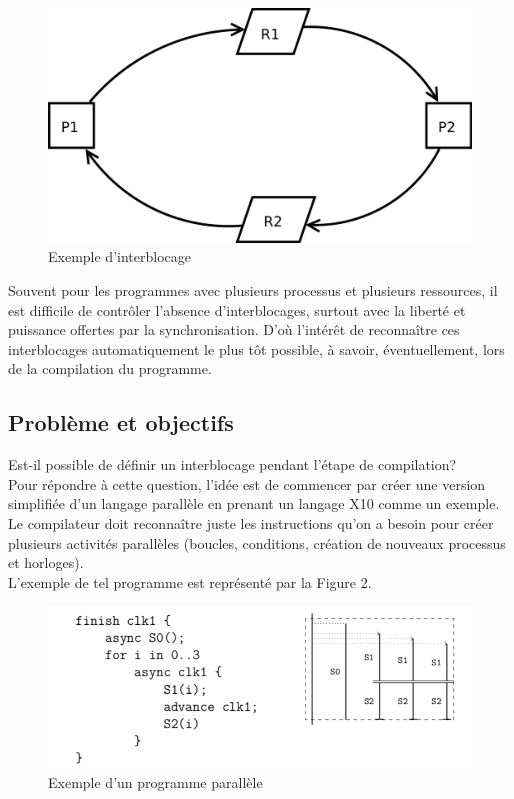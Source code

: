 \documentclass[12pt]{scrartcl}
\begin{document}
\begin{figure}[h]
  \includegraphics[scale=0.2]{deadlock}
  \centering
  \caption{Exemple d'interblocage}
  \centering
\end{figure}

Souvent pour les programmes avec plusieurs processus et plusieurs ressources, il est difficile de contrôler l'absence d'interblocages, surtout avec la liberté et puissance offertes par la synchronisation.
D'où l'intérêt de reconnaître ces interblocages automatiquement le plus tôt possible, à savoir, éventuellement, lors de la compilation du programme.

\newpage
\subsection{Problème et objectifs}

Est-il possible de définir un interblocage pendant l'étape de compilation?\\

 Pour répondre à cette question, l'idée est de commencer par créer une version simplifiée d'un langage parallèle en prenant un langage X10 comme un exemple.
 Le compilateur doit reconnaître juste les instructions qu'on a besoin pour créer plusieurs activités parallèles (boucles, conditions, création de nouveaux processus et horloges).\\
 L'exemple de tel programme est représenté par la Figure 2.

 \begin{figure}[h]
  \includegraphics[scale=1]{program}
  \centering
  \caption{Exemple d'un programme parallèle}
  \centering
\end{figure}
\end{document}

